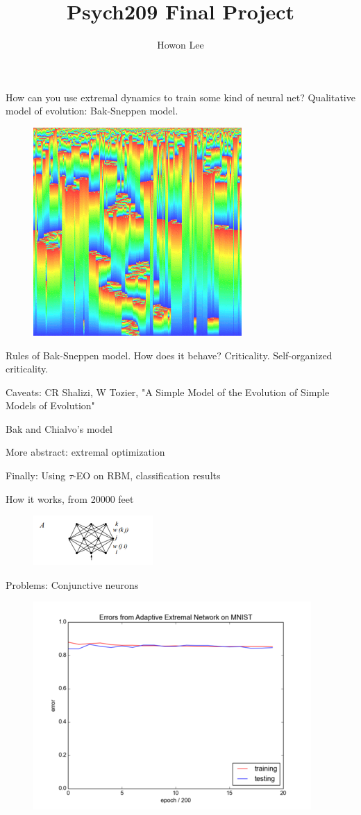 \documentclass[12pt]{article}
\begin{document}
\title{Psych209 Final Project}
\author{Howon Lee}
\maketitle


  How can you use extremal dynamics to train some kind of neural net?
  Qualitative model of evolution: Bak-Sneppen model.
  \begin{figure}
    \includegraphics{bak_sneppen}
  \end{figure}

  Rules of Bak-Sneppen model. How does it behave? Criticality. Self-organized criticality.

  Caveats: CR Shalizi, W Tozier, "A Simple Model of the Evolution of Simple Models of Evolution"
  
  Bak and Chialvo's model

  More abstract: extremal optimization

  Finally: Using $\tau$-EO on RBM, classification results
  
  How it works, from 20000 feet
  \begin{figure}
    \includegraphics{bak_chialvo_net_topology}
  \end{figure}
  
  Problems: Conjunctive neurons
  \begin{figure}
    \includegraphics{bak_plot}
  \end{figure}
\end{document}
